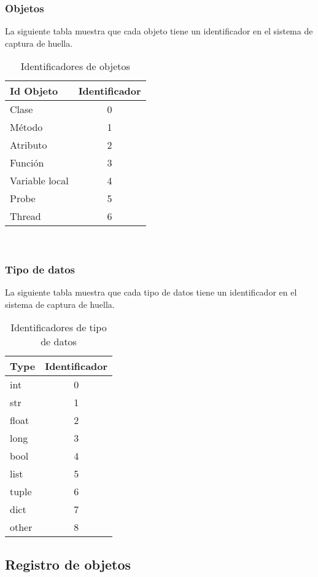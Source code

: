 \documentclass[10pt,a4paper]{article}
\begin{document}
\subsubsection{Objetos}
La siguiente tabla muestra que cada objeto tiene un identificador en el sistema de captura de huella.
\begin{table}[!h]
\begin{center}
\begin{tabular}{|l | c |}
\hline
Id Objeto & Identificador\\
\hline
Clase & 0\\
\hline
Método & 1\\
\hline
Atributo & 2\\
\hline
Función & 3\\
\hline
Variable local & 4\\
\hline
Probe & 5\\
\hline
Thread & 6\\
\hline
\end{tabular}
\caption{Identificadores de objetos} 
\end{center}
\end{table}
\\
\pagebreak

\subsubsection{Tipo de datos}
La siguiente tabla muestra que cada tipo de datos tiene un identificador en el sistema de captura de huella.
\begin{table}[!h]
\begin{center}
\begin{tabular}{|l | c |}
\hline
Type & Identificador\\
\hline
int & 0\\
\hline
str & 1\\
\hline
float & 2\\
\hline
long & 3\\
\hline
bool & 4\\
\hline
list & 5\\
\hline
tuple & 6\\
\hline
dict & 7\\
\hline
other & 8\\
\hline
\end{tabular}
\caption{Identificadores de tipo de datos} 
\end{center}
\end{table}

\subsection{Registro de objetos}
\end{document}
